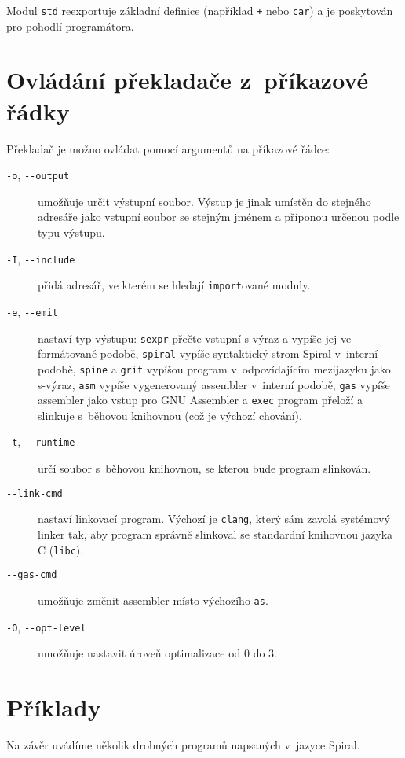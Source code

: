 
Modul \texttt{std} reexportuje základní definice (například \texttt{+} nebo
\texttt{car}) a je poskytován pro pohodlí programátora.

\section{Ovládání překladače z~příkazové řádky}

Překladač je možno ovládat pomocí argumentů na příkazové řádce:

\begin{description}
  \item[\texttt{-o}, \texttt{-{}-output}] umožňuje určit výstupní soubor.
    Výstup je jinak umístěn do stejného adresáře jako vstupní soubor se stejným
    jménem a příponou určenou podle typu výstupu.
  \item[\texttt{-I}, \texttt{-{}-include}] přidá adresář, ve kterém se hledají
    \texttt{import}ované moduly.
  \item[\texttt{-e}, \texttt{-{}-emit}] nastaví typ výstupu: \texttt{sexpr} přečte
    vstupní s-výraz a vypíše jej ve formátované podobě, \texttt{spiral} vypíše
    syntaktický strom Spiral v~interní podobě, \texttt{spine} a
    \texttt{grit} vypíšou program v~odpovídajícím mezijazyku jako s-výraz,
    \texttt{asm} vypíše vygenerovaný assembler v~interní podobě, \texttt{gas}
    vypíše assembler jako vstup pro GNU Assembler a \texttt{exec} program
    přeloží a slinkuje s~běhovou knihovnou (což je výchozí chování).
  \item[\texttt{-t}, \texttt{-{}-runtime}] určí soubor s~běhovou knihovnou, se
    kterou bude program slinkován.
  \item[\texttt{-{}-link-cmd}] nastaví linkovací program. Výchozí je \texttt{clang},
    který sám zavolá systémový linker tak, aby program správně slinkoval se
    standardní knihovnou jazyka C (\texttt{libc}).
  \item[\texttt{-{}-gas-cmd}] umožňuje změnit assembler místo výchozího
    \texttt{as}.
  \item[\texttt{-O}, \texttt{-{}-opt-level}] umožňuje nastavit úroveň optimalizace
    od 0 do 3.
\end{description}

\section{Příklady}

Na závěr uvádíme několik drobných programů napsaných v~jazyce Spiral.

